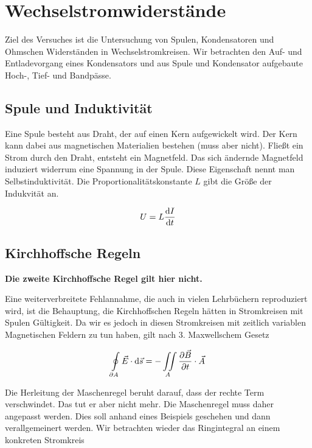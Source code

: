 \section{Wechselstromwiderstände}
Ziel des Versuches ist die Untersuchung von Spulen, Kondensatoren und Ohmschen
Widerständen in Wechselstromkreisen. Wir betrachten den Auf- und Entladevorgang
eines Kondensators und aus Spule und Kondensator aufgebaute Hoch-, Tief- und
Bandpässe.

\subsection{Spule und Induktivität}

Eine Spule besteht aus Draht, der auf einen Kern aufgewickelt wird. Der Kern
kann dabei aus magnetischen Materialien bestehen (muss aber nicht). Fließt ein
Strom durch den Draht, entsteht ein Magnetfeld. Das sich ändernde Magnetfeld
induziert widerrum eine Spannung in der Spule. Diese Eigenschaft nennt man
Selbstinduktivität. Die Proportionalitätskonstante $L$ gibt die Größe der
Indukvität an.

\begin{equation}
  U = L \frac{\dif I}{\dif t}
\end{equation}

\subsection{Kirchhoffsche Regeln}

\textbf{Die zweite Kirchhoffsche Regel gilt hier nicht.}

Eine weiterverbreitete Fehlannahme, die auch in vielen Lehrbüchern reproduziert
wird, ist die Behauptung, die Kirchhoffschen Regeln hätten in Stromkreisen mit
Spulen Gültigkeit. Da wir es jedoch in diesen Stromkreisen mit zeitlich
variablen Magnetischen Feldern zu tun haben, gilt nach 3. Maxwellschem Gesetz

\begin{equation}
  \oint\limits_{\partial A} \vec{E} \cdot \dif \vec{s} = - \iint\limits_{A} \frac{\partial \vec{B}}{\partial t} \cdot \vec{A}
\end{equation}

Die Herleitung der Maschenregel beruht darauf, dass der rechte Term
verschwindet. Das tut er aber nicht mehr. Die Maschenregel muss daher angepasst
werden. Dies soll anhand eines Beispiels geschehen und dann verallgemeinert
werden. Wir betrachten wieder das Ringintegral an einem konkreten Stromkreis


